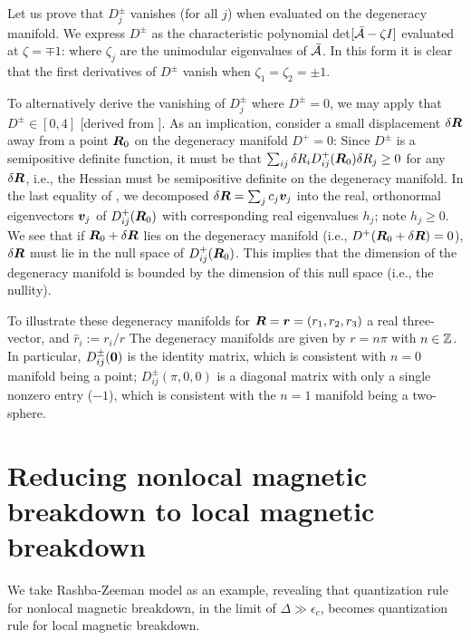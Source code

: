 \documentclass[aps, prb, showpacs, twocolumn, notitlepage, superscriptaddress]{revtex4-1}
\begin{document}
Let us prove that $D^{\pm}_j$ vanishes (for all $j$) when evaluated on the degeneracy manifold.  We express $D^{\pm}$ as the characteristic polynomial det$[{\cal \bar{A}}-\zeta I]$ evaluated at $\zeta=\mp 1$:
where $\zeta_j$ are the unimodular eigenvalues of ${\cal \bar{A}}$. In this form it is clear that
the first derivatives of $D^{\pm}$ vanish when $\zeta_1=\zeta_2=\pm 1$.

To alternatively derive the vanishing of $D^{\pm}_j$ where $D^{\pm}{=}0$, we may apply that  $D^{\pm}\in [0,4]$ [derived from ]. As an implication, consider a small displacement $\delta \boldsymbol{R}$ away from  a point $\boldsymbol{R}_0$  on the degeneracy manifold $D^{+}=0$:
Since $D^{\pm}$ is a semipositive definite function, it must be that $\sum_{ij}\delta R_i D^{+}_{ij}(\boldsymbol{R}_0) \delta R_j\geq 0$ for any $\delta \boldsymbol{R}$, i.e., the Hessian must be semipositive definite on the degeneracy manifold. In the last equality of , we decomposed $\delta \boldsymbol{R}=\sum_jc_j\boldsymbol{v}_j$ into the real, orthonormal eigenvectors $\boldsymbol{v}_j$ of $D^{+}_{ij}(\boldsymbol{R}_0)$ with corresponding real eigenvalues $h_j$; note $h_j\geq 0$. We see that if $\boldsymbol{R}_0+\delta \boldsymbol{R}$ lies on the degeneracy manifold (i.e., $D^+(\boldsymbol{R}_0+\delta \boldsymbol{R})=0$),  $\delta \boldsymbol{R}$ must lie in the null space of $D^{+}_{ij}(\boldsymbol{R}_0)$. This implies that the dimension of the degeneracy manifold is bounded by the dimension of this null space (i.e., the nullity).

To illustrate these degeneracy manifolds for $\boldsymbol{R}=\boldsymbol{r}=(r_1,r_2,r_3)$ a real three-vector, and $\hat{r}_i:=r_i/r$ 
The degeneracy manifolds are given by $r=n\pi$ with $n\in \mathbb{Z}$. In particular, $D^{\pm}_{ij}(\boldsymbol{0})$ is the identity matrix, which is consistent with $n=0$ manifold being a point; $D^{\pm}_{ij}(\pi,0,0)$ is a diagonal matrix with only a single nonzero entry ($-1$), which is consistent with the $n=1$ manifold being a two-sphere.
\section{Reducing nonlocal magnetic breakdown to local magnetic breakdown}
We take Rashba-Zeeman model as an example, revealing that quantization rule for nonlocal magnetic breakdown, in the limit of $\Delta\gg\epsilon_c$, becomes quantization rule for local magnetic breakdown.
\end{document}
